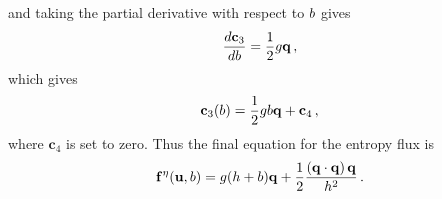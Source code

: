 and taking the partial derivative with respect to $b$
gives
\begin{equation}
  \frac{d \mathbf{c}_3}{d b} = \frac{1}{2}g\mathbf{q} \,,
\end{equation}
which gives
\begin{equation}
  \mathbf{c}_3(b) = \frac{1}{2}gb\mathbf{q}
  + \mathbf{c}_4 \,,
\end{equation}
where $\mathbf{c}_4$ is set to zero.
Thus the final equation for the entropy flux is
\begin{equation}
  \mathbf{f}^\eta(\mathbf{u},b)
  = g(h + b)\mathbf{q}
  + \frac{1}{2}\frac{\left(\mathbf{q}\cdot\mathbf{q}\right)\mathbf{q}} 
  {h^2}
  \,.
\end{equation}
